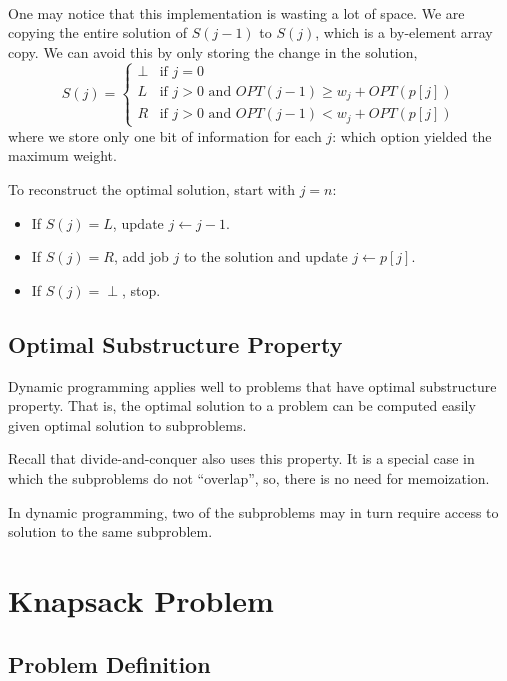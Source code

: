 {~~~}

One may notice that this implementation is wasting a lot of space. We are copying the entire solution of $S(j - 1)$ to $S(j)$, which is a by-element array copy. We can avoid this by only storing the change in the solution, \[
    S(j) = \begin{cases}
        \perp & \text{if } j = 0                                             \\
        L     & \text{if } j > 0 \text{ and } OPT(j - 1) \ge w_j + OPT(p[j]) \\
        R     & \text{if } j > 0 \text{ and } OPT(j - 1) < w_j + OPT(p[j])
    \end{cases}
\] where we store only one bit of information for each $j$: which option yielded the maximum weight. 

To reconstruct the optimal solution, start with $j = n$:
\begin{itemize}
    \item If $S(j) = L$, update $j \gets j - 1$.
    \item If $S(j) = R$, add job $j$ to the solution and update $j \gets p[j]$.
    \item If $S(j) = \perp$, stop.
\end{itemize}

\subsection{Optimal Substructure Property}

Dynamic programming applies well to problems that have optimal substructure property. That is, the optimal solution to a problem can be computed easily given optimal solution to subproblems.

\begin{remark}
    Recall that divide-and-conquer also uses this property. It is a special case in which the subproblems do not ``overlap'', so, there is no need for memoization.

    In dynamic programming, two of the subproblems may in turn require access to solution to the same subproblem.
\end{remark}

\section{Knapsack Problem}

\subsection{Problem Definition}


